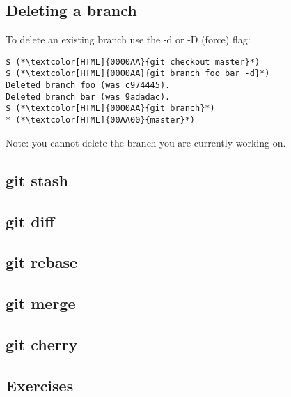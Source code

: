 \subsection{Deleting a branch}
\begin{frame}[fragile]
    \subslidetitle
To delete an existing branch use the -d or -D (force) flag:
\begin{lstlisting}
$ (*\textcolor[HTML]{0000AA}{git checkout master}*)
$ (*\textcolor[HTML]{0000AA}{git branch foo bar -d}*)
Deleted branch foo (was c974445).
Deleted branch bar (was 9adadac).
$ (*\textcolor[HTML]{0000AA}{git branch}*)
* (*\textcolor[HTML]{00AA00}{master}*)
\end{lstlisting}

Note: you cannot delete the branch you are currently working on.

\end{frame}

\subsection{git stash}
\begin{frame}[fragile]
    \subslidetitle
\end{frame}

\subsection{git diff}
\begin{frame}[fragile]
    \subslidetitle
\end{frame}

\subsection{git rebase}
\begin{frame}[fragile]
    \subslidetitle
\end{frame}

\subsection{git merge}
\begin{frame}[fragile]
    \subslidetitle
\end{frame}

\subsection{git cherry}
\begin{frame}[fragile]
    \subslidetitle
\end{frame}

\subsection{Exercises}
\begin{frame}[fragile]
  \subslidetitle
\end{frame}
